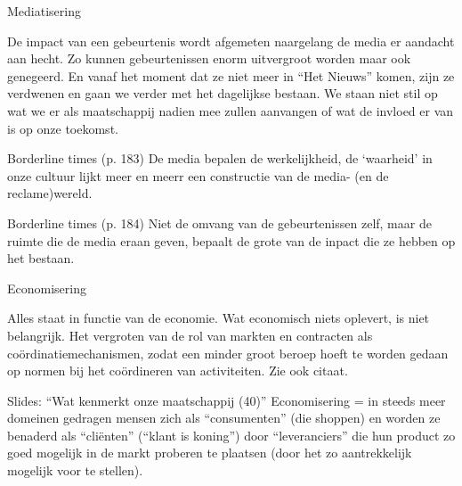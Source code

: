 \documentclass[main.tex]{subfiles}
\begin{document}
\begin{examenvraag}
    \begin{vraag}
        Mediatisering
    \end{vraag}

    \begin{antwoord}
        De impact van een gebeurtenis wordt afgemeten naargelang de media er aandacht aan hecht.‭ ‬Zo 
        kunnen gebeurtenissen enorm uitvergroot worden maar ook genegeerd.‭ ‬En vanaf het moment dat 
        ze niet meer in‭ “‬Het Nieuws‭”‬ komen,‭ ‬zijn ze verdwenen en gaan we verder met het dagelijkse 
        bestaan.‭ ‬We staan niet stil op wat we er als maatschappij nadien mee zullen aanvangen of 
        wat de invloed er van is op onze toekomst.
        \begin{citaat}{Borderline times (p. 183)}
            De media bepalen de werkelijkheid, de `waarheid' in onze cultuur lijkt meer en meerr een constructie van de media- (en de reclame)wereld.
        \end{citaat}
        \begin{citaat}{Borderline times (p. 184)}
            Niet de omvang van de gebeurtenissen zelf, maar de ruimte die de media eraan geven, bepaalt de grote van de inpact die ze hebben op het bestaan.
        \end{citaat}
    \end{antwoord}
\end{examenvraag}


\begin{examenvraag}
    \begin{vraag}
        Economisering
    \end{vraag}

    \begin{antwoord}
    	Alles staat in functie van de economie.‭ ‬Wat economisch niets oplevert,‭ ‬is niet belangrijk.
        Het vergroten van de rol van markten en contracten als co\"ordinatiemechanismen, zodat een 
        minder groot beroep hoeft te worden gedaan op normen bij het co\"ordineren van 
        activiteiten. Zie ook citaat.
        \begin{citaat}{Slides: ``Wat kenmerkt onze maatschappij (40)''}
            Economisering = in steeds meer domeinen gedragen mensen zich als “consumenten” (die shoppen) en worden ze benaderd als “cliënten” (“klant is koning”) door “leveranciers” die hun product zo goed mogelijk in de markt proberen te plaatsen (door het zo aantrekkelijk mogelijk voor te stellen).
        \end{citaat}
    \end{antwoord}
\end{examenvraag}
\end{document}
